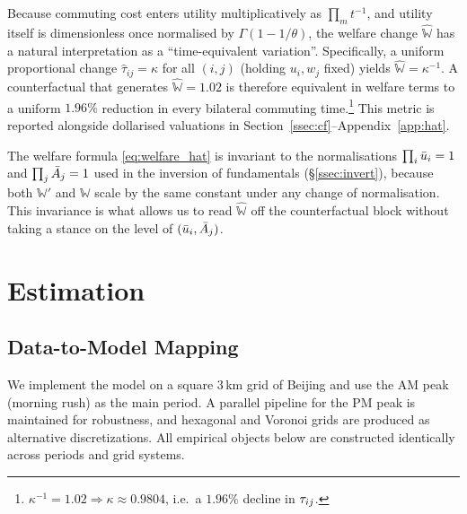 \begin{remark}
Because commuting cost enters utility multiplicatively as
$\prod_m t^{-1}$, and utility itself is dimensionless once
normalised by $\Gamma(1-1/\theta)$, the welfare change
$\hat{\mathbb W}$ has a natural interpretation as a
``time-equivalent variation''.  Specifically, a uniform proportional
change $\hat{\tau}_{ij}=\kappa$ for all $(i,j)$ (holding $u_i,w_j$
fixed) yields $\hat{\mathbb W}=\kappa^{-1}$.  A counterfactual that
generates $\hat{\mathbb W}=1.02$ is therefore equivalent in welfare
terms to a uniform $1.96\%$ reduction in every bilateral commuting
time.\footnote{$\kappa^{-1}=1.02\Rightarrow \kappa\approx 0.9804$,
i.e.\ a $1.96\%$ decline in $\tau_{ij}$.}  This metric is reported
alongside dollarised valuations in
Section~\ref{ssec:cf}--Appendix~\ref{app:hat}.
\end{remark}

\begin{remark}
The welfare formula \eqref{eq:welfare_hat} is invariant to the
normalisations $\prod_i\bar u_i=1$ and $\prod_j\bar A_j=1$ used in the
inversion of fundamentals (\S\ref{ssec:invert}), because both
$\mathbb W'$ and $\mathbb W$ scale by the same constant under any
change of normalisation.  This invariance is what allows us to read
$\hat{\mathbb W}$ off the counterfactual block without taking a
stance on the level of $(\bar u_i,\bar A_j)$.
\end{remark}

\section{Estimation}\label{sec:est}

\subsection{Data-to-Model Mapping}\label{ssec:data}

We implement the model on a square 3\,km grid of Beijing and use the
AM peak (morning rush) as the main period.  A parallel pipeline for
the PM peak is maintained for robustness, and hexagonal and Voronoi
grids are produced as alternative discretizations.  All empirical
objects below are constructed identically across periods and grid
systems.

